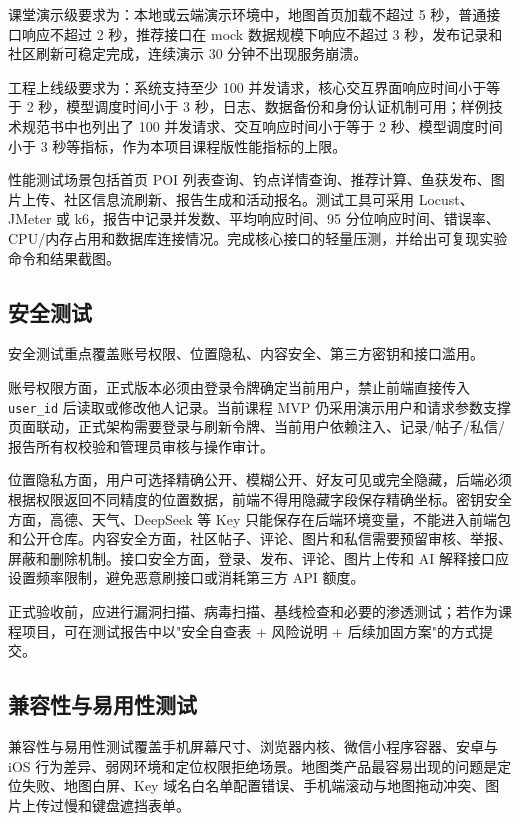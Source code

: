 课堂演示级要求为：本地或云端演示环境中，地图首页加载不超过 5 秒，普通接口响应不超过 2 秒，推荐接口在 mock 数据规模下响应不超过 3 秒，发布记录和社区刷新可稳定完成，连续演示 30 分钟不出现服务崩溃。

工程上线级要求为：系统支持至少 100 并发请求，核心交互界面响应时间小于等于 2 秒，模型调度时间小于 3 秒，日志、数据备份和身份认证机制可用；样例技术规范书中也列出了 100 并发请求、交互响应时间小于等于 2 秒、模型调度时间小于 3 秒等指标，作为本项目课程版性能指标的上限。

性能测试场景包括首页 POI 列表查询、钓点详情查询、推荐计算、鱼获发布、图片上传、社区信息流刷新、报告生成和活动报名。测试工具可采用 Locust、JMeter 或 k6，报告中记录并发数、平均响应时间、95 分位响应时间、错误率、CPU/内存占用和数据库连接情况。完成核心接口的轻量压测，并给出可复现实验命令和结果截图。

\subsection{安全测试}

安全测试重点覆盖账号权限、位置隐私、内容安全、第三方密钥和接口滥用。

账号权限方面，正式版本必须由登录令牌确定当前用户，禁止前端直接传入 \texttt{user\_id} 后读取或修改他人记录。当前课程 MVP 仍采用演示用户和请求参数支撑页面联动，正式架构需要登录与刷新令牌、当前用户依赖注入、记录/帖子/私信/报告所有权校验和管理员审核与操作审计。

位置隐私方面，用户可选择精确公开、模糊公开、好友可见或完全隐藏，后端必须根据权限返回不同精度的位置数据，前端不得用隐藏字段保存精确坐标。密钥安全方面，高德、天气、DeepSeek 等 Key 只能保存在后端环境变量，不能进入前端包和公开仓库。内容安全方面，社区帖子、评论、图片和私信需要预留审核、举报、屏蔽和删除机制。接口安全方面，登录、发布、评论、图片上传和 AI 解释接口应设置频率限制，避免恶意刷接口或消耗第三方 API 额度。

正式验收前，应进行漏洞扫描、病毒扫描、基线检查和必要的渗透测试；若作为课程项目，可在测试报告中以"安全自查表 + 风险说明 + 后续加固方案"的方式提交。

\subsection{兼容性与易用性测试}

兼容性与易用性测试覆盖手机屏幕尺寸、浏览器内核、微信小程序容器、安卓与 iOS 行为差异、弱网环境和定位权限拒绝场景。地图类产品最容易出现的问题是定位失败、地图白屏、Key 域名白名单配置错误、手机端滚动与地图拖动冲突、图片上传过慢和键盘遮挡表单。


